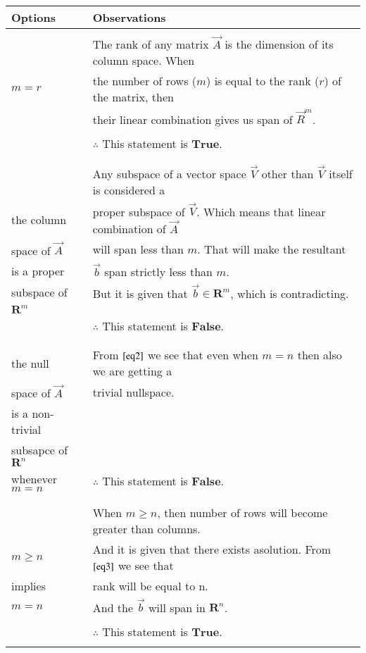 \documentclass[journal,12pt,twocolumn]{IEEEtran}
\begin{document}
	\begin{table}[hp]
		\begin{tabular}{|l|l|}
			\hline
			Options & Observations\\
			\hline
			& \\
			& The rank of any matrix $\vec{A}$ is the dimension of its column space. When  \\
			$m = r$&  the number of rows ($m$) is equal to the rank ($r$) of the matrix, then \\
			&  their linear combination gives us span of $\vec{R}^{m}$.\\
			& \\
			& $\therefore$ This statement is $\textbf{True}$. \\
			& \\
			\hline 
			& \\
			& Any subspace of a vector space $\vec{V}$ other than $\vec{V}$ itself is considered a \\
			the column & proper subspace of $\vec{V}$. Which means that linear combination of $\vec{A}$\\
			space of $\vec{A}$ & will span less than $m$. That will make the resultant\\
			is a proper & $\vec{b}$ span strictly less than $m$.\\ 
			subspace of & But it is given that $\vec{b} \in \mathbf{R}^{m}$, which is contradicting.\\  
			$\mathbf{R}^{m}$ & \\
			& $\therefore$ This statement is $\textbf{False}$. \\
			& \\
			\hline
			& \\
			the null & From $\eqref{eq2}$ we see that even when $m = n$ then also we are getting a\\ 
			space of $\vec{A}$ & trivial nullspace. \\
			is a non-trivial& \\
			subsapce of $\mathbf{R}^{n}$& \\
			whenever $m=n$& $\therefore$ This statement is $\textbf{False}$. \\
			& \\
			\hline
			& \\
			& When $m \geq n$, then number of rows will become greater than columns.\\
			$m \geq n$ & And it is given that there exists asolution. From $\eqref{eq3}$ we see that \\
			implies & rank will be equal to n.\\
			$m=n$ & And the $\vec{b}$ will span in $\mathbf{R}^{n}$.\\
			& \\
			& $\therefore$ This statement is $\textbf{True}$. \\
			& \\
			\hline
		\end{tabular}
	\end{table}
	
\end{document}
